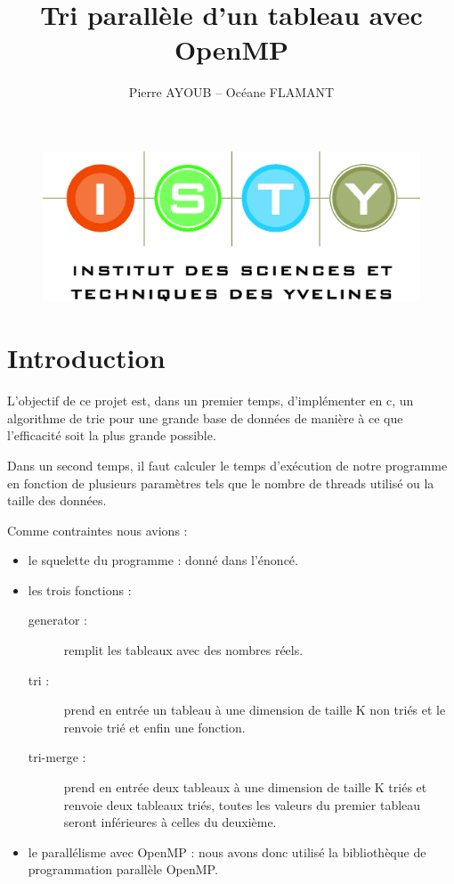 \documentclass[12pt]{article}
\begin{document}
\title{Tri parallèle d'un tableau avec OpenMP}
\author{Pierre AYOUB -- Océane FLAMANT}

\maketitle

\begin{figure}[b]
    \centering
    \includegraphics[scale=0.3]{pictures/isty.jpg}
\end{figure}

\newpage

\section{Introduction}
    
    L'objectif de ce projet est, dans un premier temps, d'implémenter en c, un algorithme de trie pour une grande base de données de manière à ce que l'efficacité soit la plus grande possible. 
    
    Dans un second temps, il faut calculer le temps d'exécution de notre programme en fonction de plusieurs paramètres tels que le nombre de threads utilisé ou la taille des données.

    Comme contraintes nous avions :
\begin{itemize}  
\item{le squelette du programme : donné dans l'énoncé.}
    
\item{les trois fonctions :
    \begin{description}
    \item[generator :] {remplit les tableaux avec des nombres réels.}
    \item[tri :] {prend en entrée un tableau à une dimension de taille K non triés et le renvoie trié et enfin une fonction.}
    \item[tri-merge :] {prend en entrée deux tableaux à une dimension de taille K triés et renvoie deux tableaux triés, toutes les valeurs du premier tableau seront inférieures à celles du deuxième.}
    \end{description}}
\item{le parallélisme avec OpenMP : nous avons donc utilisé la bibliothèque de programmation parallèle OpenMP.}
\end{itemize}
\end{document}
